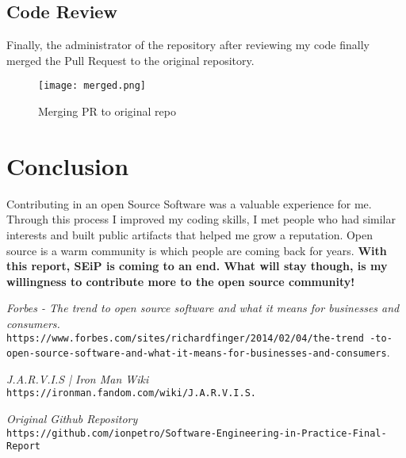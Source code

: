 \documentclass[12pt]{article}
\begin{document}
  \subsection{Code Review}
  
  Finally, the administrator of the repository after reviewing my code finally merged the Pull Request to the original repository.
  
  \begin{figure}[h]
\centerline{\texttt{[image: merged.png]}}
  \caption{Merging PR to original repo}
  \label{fig:verticalcell}
\end{figure}
  
\section{Conclusion}

Contributing in an open Source Software was a valuable experience for me. Through this process I improved my coding skills, I met people who had similar interests and built public artifacts that helped me grow a reputation. Open source is a warm community is which people are coming back for years. \textbf{With this report, SEiP is coming to an end. What will stay though, is my willingness to contribute more to the open source community!}

\begin{thebibliography}{9}

\textit{Forbes - The trend to open source software and what it means for businesses and consumers.}
\\\texttt{https://www.forbes.com/sites/richardfinger/2014/02/04/the-trend
-to-open-source-software-and-what-it-means-for-businesses-and-consumers}.

\textit{J.A.R.V.I.S | Iron Man Wiki}
\\\texttt{https://ironman.fandom.com/wiki/J.A.R.V.I.S.}

\textit{Original Github Repository}
\\\texttt{https://github.com/ionpetro/Software-Engineering-in-Practice-Final-Report}

\end{thebibliography} 
 
\end{document}
